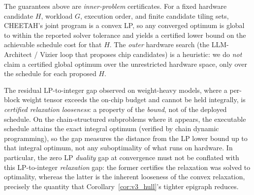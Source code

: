 \begin{remark}
\label{rem:scope}
The guarantees above are \emph{inner-problem} certificates. For a fixed hardware
candidate $H$, workload $G$, execution order, and finite candidate tiling sets,
CHEETAH's joint program is a convex LP, so any converged optimum is global to
within the reported solver tolerance and yields a certified lower bound on the
achievable schedule cost for that $H$. The \emph{outer} hardware search (the
LLM-Architect / Vizier loop that proposes chip candidates) is a heuristic: we do
\emph{not} claim a certified global optimum over the unrestricted hardware space,
only over the schedule for each proposed $H$.

The residual LP-to-integer gap observed on weight-heavy models, where a
per-block weight tensor exceeds the on-chip budget and cannot be held
integrally, is \emph{certified relaxation looseness}: a property of the
\emph{bound}, not of the deployed schedule. On the chain-structured subproblems
where it appears, the executable schedule attains the exact integral optimum
(verified by chain dynamic programming), so the gap measures the distance from
the LP lower bound up to that integral optimum, not any suboptimality of what
runs on hardware. In particular, the zero LP \emph{duality} gap at convergence
must not be conflated with this LP-to-integer \emph{relaxation} gap: the former
certifies the relaxation was solved to optimality, whereas the latter is the
inherent looseness of the convex relaxation, precisely the quantity that
Corollary~\ref{cor:v3_hull}'s tighter epigraph reduces.
\end{remark}
